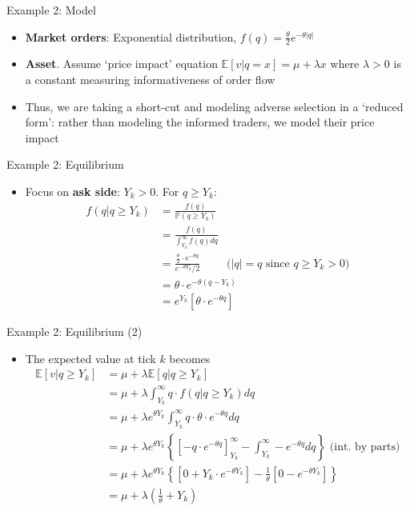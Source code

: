 \documentclass[english,10pt]{beamer}
\begin{document}
\begin{frame}{Example 2: Model}
	\begin{itemize}
		\item \textbf{Market orders}: Exponential distribution, $f(q)=\frac{\theta}{2} e^{-\theta|q|}$
		\item \textbf{Asset}.  Assume `price impact' equation $\mathbb{E}[v|q=x] = \mu + \lambda x$ where $\lambda >0$ is a constant measuring informativeness of order flow
		\item Thus,  we are taking a short-cut and modeling adverse selection in a `reduced form': rather than modeling the informed traders, we model their price impact
	\end{itemize}
\end{frame}


\begin{frame}{Example 2: Equilibrium}
	\begin{itemize}
		\item Focus on  \textbf{ask side}: $Y_k>0$. For $q \geq Y_{k}$:
		\begin{align*}
		f(q|q \ge Y_k)&=\frac{f(q)}{ \mathbb{P}(q \geq Y_{k})} \\
		&= \frac{f(q)}{\int^\infty_{Y_k} f(q) dq}\\
		&= \frac{\frac{\theta}{2} \cdot e^{-\theta q}}{e^{-\theta Y_{k}}/2} \quad \quad \text{ ($|q|=q$ since $q \ge Y_k>0$)}\\
		& =\theta \cdot e^{-\theta(q-Y_{k})}\\
		& = e^{Y_k} \left[ \theta \cdot e^{-\theta q} \right]
		\end{align*}
	\end{itemize}
\end{frame}


\begin{frame}{Example 2: Equilibrium (2)}
	\begin{itemize}
		\item The expected value at tick $k$ becomes
		\begin{align*}
		\mathbb{E}[v|q \geq Y_{k}] & =  \mu + \lambda \mathbb{E}[q|q \geq Y_{k}]\\
		&=\mu+ \lambda \int^\infty_{Y_k} q \cdot f(q|q \geq Y_{k}) dq\\
		&=\mu+ \lambda e^{\theta Y_{k}} \int^\infty_{Y_k} q \cdot \theta \cdot e^{-\theta q} dq\\
		& =  \mu+ \lambda e^{\theta Y_{k}} \left\{\left[- q \cdot e^{-\theta q} \right]^\infty_{Y_k} -\int^\infty_{Y_k} -e^{-\theta q} dq   \right\}\text{ (int. by parts)} \\
		& =  \mu+ \lambda e^{\theta Y_{k}} \left\{\left[0+ Y_k \cdot  e^{-\theta Y_k} \right] -\frac{1}{\theta}[0-e^{-\theta Y_k}]   \right\} \\
		& = \mu + \lambda \left( \frac{1}{\theta }+ Y_{k} \right)
		\end{align*}
	\end{itemize}
\end{frame}
\end{document}
